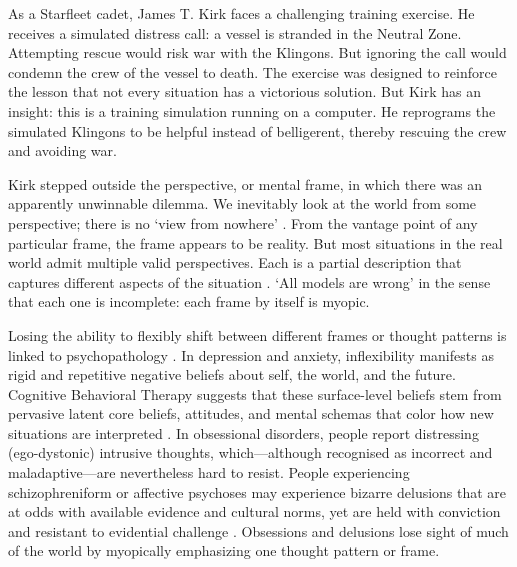 \documentclass[12pt]{article}
\begin{document}

As a Starfleet cadet, James T. Kirk faces a challenging training exercise. He receives a simulated distress call: a vessel is stranded in the Neutral Zone. Attempting rescue would risk war with the Klingons. But ignoring the call would condemn the crew of the vessel to death. The exercise was designed to reinforce the lesson that not every situation has a victorious solution. But Kirk has an insight: this is a training simulation running on a computer. He reprograms the simulated Klingons to be helpful instead of belligerent, thereby rescuing the crew and avoiding war. 

Kirk stepped outside the perspective, or mental frame, in which there was an apparently unwinnable dilemma. We inevitably look at the world from some perspective; there is no `view from nowhere' \citep{nagel1986view}. From the vantage point of any particular frame, the frame appears to be reality. But most situations in the real world admit multiple valid perspectives. Each is a partial description that captures different aspects of the situation \citep{goffman1974frame, lakoff1980metaphors, javed2024big, goodman1978ways, feyerabend1975against}. `All models are wrong' \citep{box1976science} in the sense that each one is incomplete: each frame by itself is myopic.


Losing the ability to flexibly shift between different frames or thought patterns is linked to psychopathology \citep{kashdan2010psychological, reich1933character, shapiro1965neurotic}. In depression and anxiety, inflexibility manifests as rigid and repetitive negative beliefs about self, the world, and the future. Cognitive Behavioral Therapy suggests that these surface-level beliefs stem from pervasive latent core beliefs, attitudes, and mental schemas that color how new situations are interpreted \citep{beck2011cognitive}. In obsessional disorders, people report distressing (ego-dystonic) intrusive thoughts, which---although recognised as incorrect and maladaptive---are nevertheless hard to resist. People experiencing schizophreniform or affective psychoses may experience bizarre delusions that are at odds with available evidence and cultural norms, yet are held with conviction and resistant to evidential challenge \citep{mishara2010klaus, jaspers1997general, american2013diagnostic, heinz2019towards, adams2013computational}. Obsessions and delusions lose sight of much of the world by myopically emphasizing one thought pattern or frame.
\end{document}
